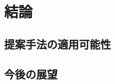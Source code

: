 \chapter{結論}
\thispagestyle{empty}
\label{chap6}
\graphicspath{{chap6/figure/}}
\minitoc

\newpage


\section{提案手法の適用可能性}
\label{chap6_conclusion}




\clearpage


\newpage

\section{今後の展望}
\label{chap6_futureworks}


\clearpage
\newpage



